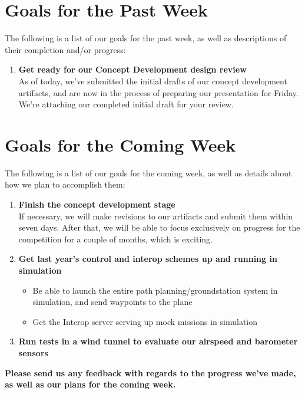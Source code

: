 \documentclass[]{../auvsi_doc}
\begin{document}
\section{Goals for the Past Week}

The following is a list of our goals for the past week, as well as descriptions of their completion and/or progress:

\begin{enumerate}
\item \textbf{Get ready for our Concept Development design review}\\
As of today, we've submitted the initial drafts of our concept development artifacts, and are now in the process of preparing our presentation for Friday. We're attaching our completed initial draft for your review.
\end{enumerate}

\section{Goals for the Coming Week}

The following is a list of our goals for the coming week, as well as details about how we plan to accomplish them:

\begin{enumerate}
\item \textbf{Finish the concept development stage}\\
If necessary, we will make revisions to our artifacts and submit them within seven days. After that, we will be able to focus exclusively on progress for the competition for a couple of months, which is exciting.
\item \textbf{Get last year's control and interop schemes up and running in simulation}\\
\begin{itemize}
	\item Be able to launch the entire path planning/groundstation system in simulation, and send waypoints to the plane
	\item Get the Interop server serving up mock missions in simulation
\end{itemize}
\item \textbf{Run tests in a wind tunnel to evaluate our airspeed and barometer sensors}
\end{enumerate}

\textbf{Please send us any feedback with regards to the progress we've made, as well as our plans for the coming week.}
\end{document}

